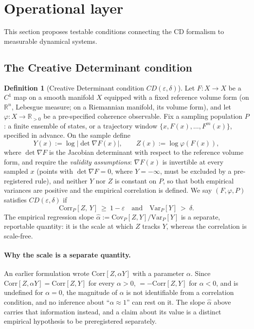 \documentclass[11pt]{article}
\theoremstyle{plain}
\theoremstyle{definition}
\newtheorem{definition}[theorem]{Definition}
\theoremstyle{remark}
\newcommand{\R}{\mathbb{R}}
\newcommand{\abs}[1]{\left\lvert #1\right\rvert}
\begin{document}
\section{Operational layer}
This section proposes testable conditions connecting the CD formalism to measurable dynamical systems.

\subsection{The Creative Determinant condition}
\begin{definition}[Creative Determinant condition \(CD(\varepsilon,\delta)\)]\label{def:CDcondition}
Let \(F:X\to X\) be a \(C^1\) map on a smooth manifold \(X\) equipped with a fixed reference volume form (on \(\R^n\), Lebesgue measure; on a Riemannian manifold, its volume form), and let \(\varphi:X\to\R_{>0}\) be a pre-specified coherence observable. Fix a sampling population \(P\): a finite ensemble of states, or a trajectory window \(\{x,F(x),\dots,F^{m}(x)\}\), specified in advance. On the sample define
\[
Y(x):=\log\abs{\det \nabla F(x)},\qquad Z(x):=\log\varphi(F(x)),
\]
where \(\det\nabla F\) is the Jacobian determinant with respect to the reference volume form, and require the \emph{validity assumptions}: \(\nabla F(x)\) is invertible at every sampled \(x\) (points with \(\det\nabla F=0\), where \(Y=-\infty\), must be excluded by a pre-registered rule), and neither \(Y\) nor \(Z\) is constant on \(P\), so that both empirical variances are positive and the empirical correlation is defined. We say \((F,\varphi,P)\) satisfies \(CD(\varepsilon,\delta)\) if
\[
\mathrm{Corr}_P[Z,\,Y]\ \ge\ 1-\varepsilon
\quad\text{and}\quad
\mathrm{Var}_P[Y]\ >\ \delta .
\]
The empirical regression slope \(\hat\alpha:=\mathrm{Cov}_P[Z,Y]/\mathrm{Var}_P[Y]\) is a separate, reportable quantity: it is the scale at which \(Z\) tracks \(Y\), whereas the correlation is scale-free.
\end{definition}

\paragraph{Why the scale is a separate quantity.}\label{rem:alphaNotIdentifiable}
An earlier formulation wrote \(\mathrm{Corr}[Z,\alpha Y]\) with a parameter \(\alpha\). Since \(\mathrm{Corr}[Z,\alpha Y]=\mathrm{Corr}[Z,Y]\) for every \(\alpha>0\), \(=-\mathrm{Corr}[Z,Y]\) for \(\alpha<0\), and is undefined for \(\alpha=0\), the magnitude of \(\alpha\) is not identifiable from a correlation condition, and no inference about ``\(\alpha\approx 1\)'' can rest on it. The slope \(\hat\alpha\) above carries that information instead, and a claim about its value is a distinct empirical hypothesis to be preregistered separately.
\end{document}
